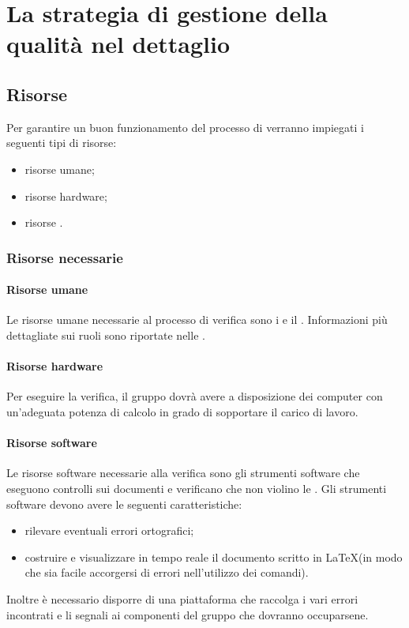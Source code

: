 \documentclass[PianoDiQualifica.tex]{subfiles}
\begin{document}
\section{La strategia di gestione della qualità nel dettaglio}

	\subsection{Risorse}
	Per garantire un buon funzionamento del processo di  verranno impiegati i seguenti tipi di risorse:
	\begin{itemize}
		\item risorse umane;
		\item risorse hardware;
		\item risorse .
	\end{itemize}
	
		\subsubsection{Risorse necessarie}
		
			\paragraph{Risorse umane}
			Le risorse umane necessarie al processo di verifica sono i \VERP{} e il \RESP{}. Informazioni più dettagliate sui ruoli sono riportate nelle \NPdocRR{}.
			
			\paragraph{Risorse hardware}
			Per eseguire la verifica, il gruppo dovrà avere a disposizione dei computer con un'adeguata potenza di calcolo in grado di sopportare il carico di lavoro.
			
			\paragraph{Risorse software}
			Le risorse software necessarie alla verifica sono gli strumenti software che eseguono controlli sui documenti e verificano che non violino le \NPdocRR{}.
			Gli strumenti software devono avere le seguenti caratteristiche:
			\begin{itemize}
				\item rilevare eventuali errori ortografici;
				\item costruire e visualizzare in tempo reale il documento scritto in \LaTeX (in modo che sia facile accorgersi di errori nell’utilizzo dei comandi).
			\end{itemize}
			Inoltre è necessario disporre di una piattaforma che raccolga i vari errori incontrati e li segnali ai componenti del gruppo che dovranno occuparsene.
			
\end{document}
